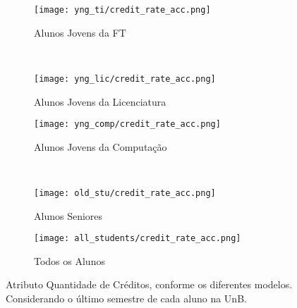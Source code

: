 \clearpage
\begin{figure}[!ht]
    \centering
    \begin{subfigure}[b]{0.48\textwidth}
        \centering
        \texttt{[image: yng\_ti/credit\_rate\_acc.png]}
        \caption{Alunos Jovens da FT}
    \end{subfigure}
    ~
    \begin{subfigure}[b]{0.48\textwidth}
        \centering
        \texttt{[image: yng\_lic/credit\_rate\_acc.png]}
        \caption{Alunos Jovens da Licenciatura}
    \end{subfigure}

    \begin{subfigure}[b]{0.48\textwidth}
        \centering
        \texttt{[image: yng\_comp/credit\_rate\_acc.png]}
        \caption{Alunos Jovens da Computação}
    \end{subfigure}
    ~
    \begin{subfigure}[b]{0.48\textwidth}
        \centering
        \texttt{[image: old\_stu/credit\_rate\_acc.png]}
        \caption{Alunos Seniores}
    \end{subfigure}

    \begin{subfigure}[b]{0.48\textwidth}
        \centering
        \texttt{[image: all\_students/credit\_rate\_acc.png]}
        \caption{Todos os Alunos}
    \end{subfigure}
    \caption{Atributo Quantidade de Créditos, conforme os diferentes modelos.
    Considerando o último semestre de cada aluno na UnB.}
\end{figure}

